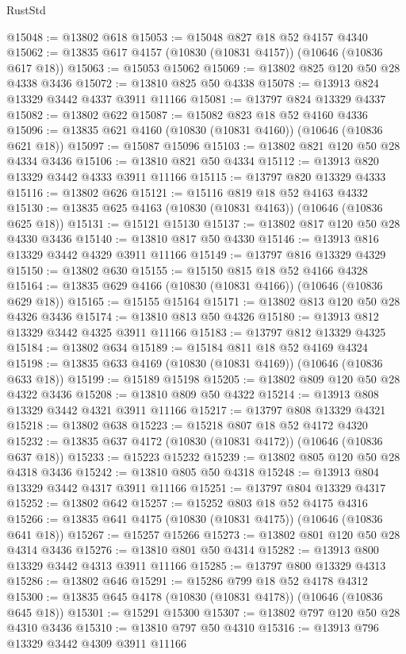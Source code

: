 \begin{lexlean}{RustStd}
\begin{coremodule}
@15048 := @13802 @618
@15053 := @15048 @827 @18 @52 @4157 @4340
@15062 := @13835 @617 @4157 (@10830 (@10831 @4157)) (@10646 (@10836 @617 @18))
@15063 := @15053 @15062
@15069 := @13802 @825 @120 @50 @28 @4338 @3436
@15072 := @13810 @825 @50 @4338
@15078 := @13913 @824 @13329 @3442 @4337 @3911 @11166
@15081 := @13797 @824 @13329 @4337
@15082 := @13802 @622
@15087 := @15082 @823 @18 @52 @4160 @4336
@15096 := @13835 @621 @4160 (@10830 (@10831 @4160)) (@10646 (@10836 @621 @18))
@15097 := @15087 @15096
@15103 := @13802 @821 @120 @50 @28 @4334 @3436
@15106 := @13810 @821 @50 @4334
@15112 := @13913 @820 @13329 @3442 @4333 @3911 @11166
@15115 := @13797 @820 @13329 @4333
@15116 := @13802 @626
@15121 := @15116 @819 @18 @52 @4163 @4332
@15130 := @13835 @625 @4163 (@10830 (@10831 @4163)) (@10646 (@10836 @625 @18))
@15131 := @15121 @15130
@15137 := @13802 @817 @120 @50 @28 @4330 @3436
@15140 := @13810 @817 @50 @4330
@15146 := @13913 @816 @13329 @3442 @4329 @3911 @11166
@15149 := @13797 @816 @13329 @4329
@15150 := @13802 @630
@15155 := @15150 @815 @18 @52 @4166 @4328
@15164 := @13835 @629 @4166 (@10830 (@10831 @4166)) (@10646 (@10836 @629 @18))
@15165 := @15155 @15164
@15171 := @13802 @813 @120 @50 @28 @4326 @3436
@15174 := @13810 @813 @50 @4326
@15180 := @13913 @812 @13329 @3442 @4325 @3911 @11166
@15183 := @13797 @812 @13329 @4325
@15184 := @13802 @634
@15189 := @15184 @811 @18 @52 @4169 @4324
@15198 := @13835 @633 @4169 (@10830 (@10831 @4169)) (@10646 (@10836 @633 @18))
@15199 := @15189 @15198
@15205 := @13802 @809 @120 @50 @28 @4322 @3436
@15208 := @13810 @809 @50 @4322
@15214 := @13913 @808 @13329 @3442 @4321 @3911 @11166
@15217 := @13797 @808 @13329 @4321
@15218 := @13802 @638
@15223 := @15218 @807 @18 @52 @4172 @4320
@15232 := @13835 @637 @4172 (@10830 (@10831 @4172)) (@10646 (@10836 @637 @18))
@15233 := @15223 @15232
@15239 := @13802 @805 @120 @50 @28 @4318 @3436
@15242 := @13810 @805 @50 @4318
@15248 := @13913 @804 @13329 @3442 @4317 @3911 @11166
@15251 := @13797 @804 @13329 @4317
@15252 := @13802 @642
@15257 := @15252 @803 @18 @52 @4175 @4316
@15266 := @13835 @641 @4175 (@10830 (@10831 @4175)) (@10646 (@10836 @641 @18))
@15267 := @15257 @15266
@15273 := @13802 @801 @120 @50 @28 @4314 @3436
@15276 := @13810 @801 @50 @4314
@15282 := @13913 @800 @13329 @3442 @4313 @3911 @11166
@15285 := @13797 @800 @13329 @4313
@15286 := @13802 @646
@15291 := @15286 @799 @18 @52 @4178 @4312
@15300 := @13835 @645 @4178 (@10830 (@10831 @4178)) (@10646 (@10836 @645 @18))
@15301 := @15291 @15300
@15307 := @13802 @797 @120 @50 @28 @4310 @3436
@15310 := @13810 @797 @50 @4310
@15316 := @13913 @796 @13329 @3442 @4309 @3911 @11166

\end{coremodule}
\end{lexlean}

